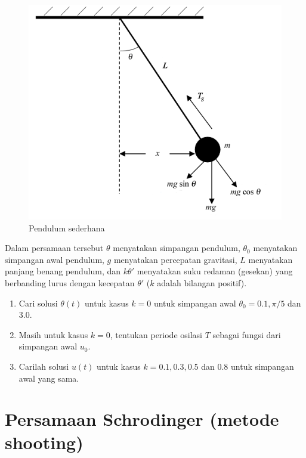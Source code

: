 \documentclass[10pt,bahasa]{article}
\begin{document}
\begin{figure}[H]
\centering
\includegraphics[scale=0.4]{images/pendulum.png}
\par
\caption{Pendulum sederhana}
\end{figure}

Dalam persamaan tersebut $\theta$ menyatakan simpangan pendulum,
$\theta_0$ menyatakan simpangan awal pendulum,
$g$ menyatakan percepatan gravitasi, $L$ menyatakan panjang benang pendulum,
dan $k\theta'$ menyatakan suku redaman (gesekan) yang berbanding lurus
dengan kecepatan $\theta'$ ($k$ adalah bilangan positif).

\begin{enumerate}[label=(\alph*)]
\item Cari solusi $\theta(t)$ untuk kasus $k=0$ untuk simpangan awal $\theta_0 = 0.1, \pi/5$
dan 3.0.
\item Masih untuk kasus $k=0$, tentukan periode osilasi $T$ sebagai
fungsi dari simpangan awal $u_0$.
\item Carilah solusi $u(t)$ untuk kasus $k = 0.1, 0.3, 0.5$ dan 0.8 untuk
simpangan awal yang sama.
\end{enumerate}


\section{Persamaan Schrodinger (metode shooting)}
\end{document}
